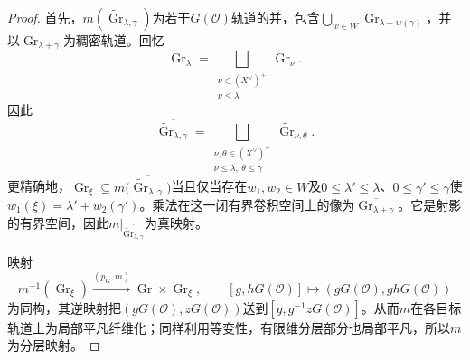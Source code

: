\begin{proof}
首先，$m(\widetilde{\operatorname{Gr}}_{\lambda,\gamma})$为若干$G(\mathcal O)$轨道的并，包含$\bigcup_{w\in W}\operatorname{Gr}_{\lambda+w(\gamma)}$，并以$\operatorname{Gr}_{\lambda+\gamma}$为稠密轨道。回忆
\[\overline{\operatorname{Gr}_\lambda}=\bigsqcup_{\substack{\nu\in(X^\vee)^+\\\nu\le\lambda}}\operatorname{Gr}_\nu.\]
因此
\[\overline{\widetilde{\operatorname{Gr}}_{\lambda,\gamma}}=\bigsqcup_{\substack{\nu,\theta\in(X^\vee)^+\\\nu\le\lambda,\ \theta\le\gamma}}\widetilde{\operatorname{Gr}}_{\nu,\theta}.\]
更精确地，$\operatorname{Gr}_\xi\subseteq m\bigl(\overline{\widetilde{\operatorname{Gr}}_{\lambda,\gamma}}\bigr)$当且仅当存在$w_1,w_2\in W$及$0\le\lambda'\le\lambda$、$0\le\gamma'\le\gamma$使$w_1(\xi)=\lambda'+w_2(\gamma')$。乘法在这一闭有界卷积空间上的像为$\overline{\operatorname{Gr}_{\lambda+\gamma}}$。它是射影的有界空间，因此$m|_{\overline{\widetilde{\operatorname{Gr}}_{\lambda,\gamma}}}$为真映射。

映射
\[m^{-1}(\operatorname{Gr}_\xi)\xrightarrow{(p_G,m)}\operatorname{Gr}\times\operatorname{Gr}_\xi,\qquad[g,hG(\mathcal O)]\longmapsto(gG(\mathcal O),ghG(\mathcal O))\]
为同构，其逆映射把$(gG(\mathcal O),zG(\mathcal O))$送到$[g,g^{-1}zG(\mathcal O)]$。从而$m$在各目标轨道上为局部平凡纤维化；同样利用等变性，有限维分层部分也局部平凡，所以$m$为分层映射。


\end{proof}
